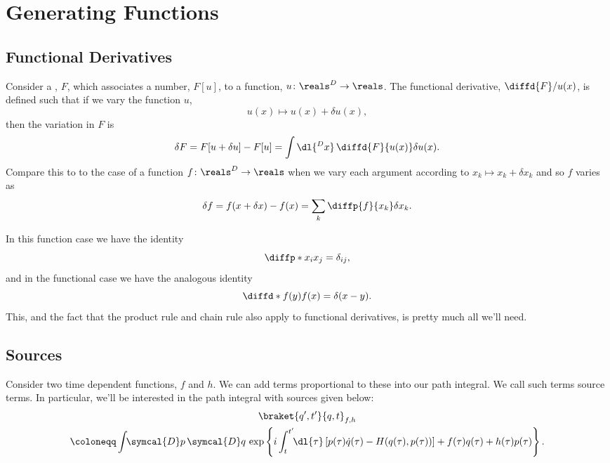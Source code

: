 \documentclass[fleqn]{NotesClass}
\newcommand{\DL}[1]{\symcal{D}#1}
\newcommand{\DD}[1]{\,\symcal{D}#1}
\begin{document}
    \chapter{Generating Functions}
    \section{Functional Derivatives}
    Consider a , \(F\), which associates a number, \(F[u]\), to a function, \(u \colon \reals^D \to \reals\).
    The functional derivative, \(\diffd{F}/{u(x)}\), is defined such that
    if we vary the function \(u\),
    \begin{equation}
        u(x) \mapsto u(x) + \delta u(x),
    \end{equation}
    then the variation in \(F\) is
    \begin{equation}
        \delta F = F[u + \delta u] - F[u] = \int \dl{^Dx} \, \diffd{F}{u(x)} \delta u(x).
    \end{equation}
    Compare this to to the case of a function \(f \colon \reals^D \to \reals\) when we vary each argument according to \(x_k \mapsto x_k + \delta x_k\) and so \(f\) varies as
    \begin{equation}
        \delta f = f(x + \delta x) - f(x) = \sum_k \diffp{f}{x_k}\delta x_k.
    \end{equation}
    
    In this function case we have the identity
    \begin{equation}
        \diffp*{x_i}{x_j} = \delta_{ij},
    \end{equation}
    and in the functional case we have the analogous identity
    \begin{equation}
        \diffd*{f(y)}{f(x)} = \delta(x - y).
    \end{equation}
    This, and the fact that the product rule and chain rule also apply to functional derivatives, is pretty much all we'll need.
    
    \section{Sources}\label{sec:sources}
    Consider two time dependent functions, \(f\) and \(h\).
    We can add terms proportional to these into our path integral.
    We call such terms source terms.
    In particular, we'll be interested in the path integral with sources given below:
    \begin{gather}
        \braket{q', t'}{q, t}_{f,h}\\
        \coloneqq \int \!\! \DL{p} \DD{q} \, \exp\left\{ i\int_t^{t'} \!\! \dl{\tau} \, [p(\tau)\dot{q}(\tau) - H(q(\tau), p(\tau))] + f(\tau)q(\tau) + h(\tau)p(\tau) \right\}. \notag
    \end{gather}
    
\end{document}
